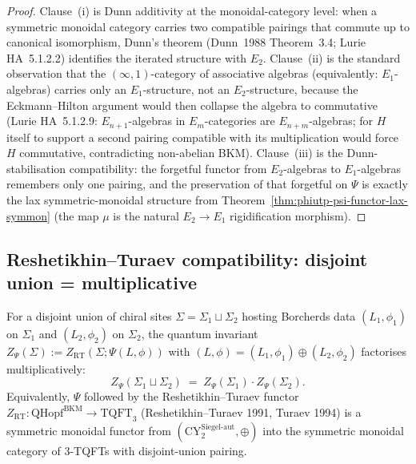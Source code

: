 \begin{proof}
Clause~(i) is Dunn additivity at the monoidal-category level: when a
symmetric monoidal category carries two compatible pairings that commute
up to canonical isomorphism, Dunn's theorem
(Dunn~1988 Theorem~3.4; Lurie HA~5.1.2.2) identifies the iterated
structure with $E_2$. Clause~(ii) is the standard observation that the
$(\infty,1)$-category of associative algebras (equivalently:
$E_1$-algebras) carries only an $E_1$-structure, not an $E_2$-structure,
because the Eckmann--Hilton argument would then collapse the algebra to
commutative
\textup{(}Lurie HA~5.1.2.9: $E_{n+1}$-algebras in $E_m$-categories are
$E_{n+m}$-algebras; for $H$ itself to support a second pairing compatible
with its multiplication would force $H$ commutative, contradicting
non-abelian BKM\textup{).} Clause~(iii) is the Dunn-stabilisation
compatibility: the forgetful functor from $E_2$-algebras to
$E_1$-algebras remembers only one pairing, and the preservation of
that forgetful on $\Psi$ is exactly the lax symmetric-monoidal
structure from Theorem~\ref{thm:phiutp-psi-functor-lax-symmon}
(the map $\mu$ is the natural $E_2 \to E_1$ rigidification morphism).
\end{proof}

\subsection{Reshetikhin--Turaev compatibility: disjoint union = multiplicative}
\label{subsec:phiutp-rt-compatibility}

\begin{corollary}
\label{cor:phiutp-rt-multiplicative}
For a disjoint union of chiral sites $\Sigma = \Sigma_1 \sqcup \Sigma_2$
hosting Borcherds data $(L_1, \phi_1)$ on $\Sigma_1$ and $(L_2, \phi_2)$
on $\Sigma_2$, the quantum invariant
$Z_\Psi(\Sigma) := Z_{\mathrm{RT}}(\Sigma; \Psi(L, \phi))$ with
$(L, \phi) = (L_1, \phi_1) \oplus (L_2, \phi_2)$ factorises
multiplicatively:
\[
 Z_\Psi(\Sigma_1 \sqcup \Sigma_2)
 \;=\;
 Z_\Psi(\Sigma_1) \cdot Z_\Psi(\Sigma_2).
\]
Equivalently, $\Psi$ followed by the Reshetikhin--Turaev functor
$Z_{\mathrm{RT}}: \mathrm{QHopf}^{\mathrm{BKM}} \to \mathrm{TQFT}_3$
\textup{(}Reshetikhin--Turaev 1991, Turaev 1994\textup{)} is a symmetric
monoidal functor from
$(\mathrm{CY}^{\mathrm{Siegel\text{-}aut}}_2, \oplus)$ into the
symmetric monoidal category of $3$-TQFTs with disjoint-union pairing.
\end{corollary}

